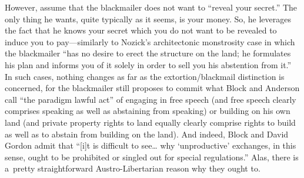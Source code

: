 However, assume that the blackmailer does not want to ``reveal your secret.'' The only thing he wants, quite typically as it seems, is your money. So, he leverages the fact that he knows your secret which you do not want to be revealed to induce you to pay---similarly to Nozick's 
\parencite*[][pp.84–85]{nozick_anarchy_1974} %
 architectonic monstrosity case in which the blackmailer ``has no desire to erect the structure on the land; he formulates his plan and informs you of it solely in order to sell you his abstention from it.'' In such cases, nothing changes as far as the extortion/blackmail distinction is concerned, for the blackmailer still proposes to commit what Block and Anderson 
\parencite*[][p.546]{block_blackmail_2000} %
 call ``the paradigm lawful act'' of engaging in free speech (and free speech clearly comprises speaking as well as abstaining from speaking) or building on his own land (and private property rights to land equally clearly comprise rights to build as well as to abstain from building on the land). And indeed, Block and David Gordon 
\parencite*[][p.49]{} %
 admit that ``[i]t is difficult to see… why ‘unproductive' exchanges, in this sense, ought to be prohibited or singled out for special regulations.'' Alas, there is a~pretty straightforward Austro-Libertarian reason why they ought to.



